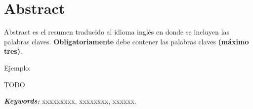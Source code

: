 \chapter*{Abstract}

Abstract es el resumen traducido al idioma inglés en donde se incluyen las palabras claves. \textbf{Obligatoriamente} debe contener las palabras claves \textbf{(máximo tres)}.

\vspace{0.5cm}

Ejemplo:

\vspace{0.5cm}

TODO

\vspace{0.5cm}

\textbf{\textit{Keywords:}} xxxxxxxxx, xxxxxxxx, xxxxxx.